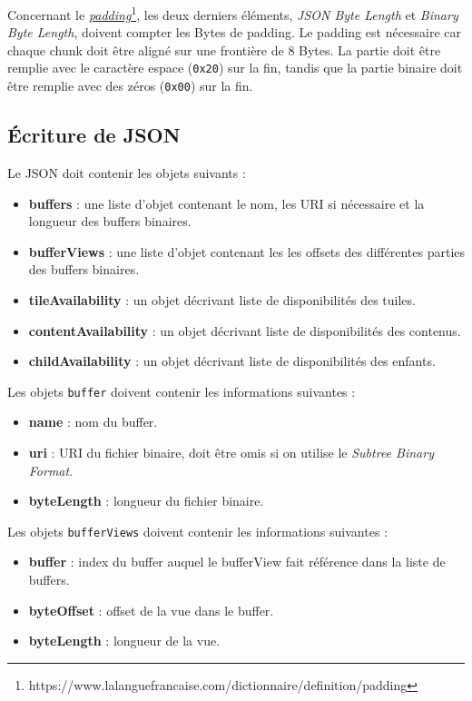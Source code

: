 Concernant le \href{https://www.lalanguefrancaise.com/dictionnaire/definition/padding}\textit{padding}\footnote{https://www.lalanguefrancaise.com/dictionnaire/definition/padding}, les deux derniers éléments, \textit{JSON Byte Length} et \textit{Binary Byte Length}, doivent compter les Bytes de padding. Le padding est nécessaire car chaque chunk doit être aligné sur une frontière de 8 Bytes. La partie doit être remplie avec le caractère espace (\texttt{0x20}) sur la fin, tandis que la partie binaire doit être remplie avec des zéros (\texttt{0x00}) sur la fin.

\newpage
\subsection{Écriture de JSON}

Le JSON doit contenir les objets suivants :

\begin{itemize}
    \item \textbf{buffers} : une liste d'objet contenant le nom, les URI si nécessaire et la longueur des buffers binaires.
    \item \textbf{bufferViews} : une liste d'objet contenant les les offsets des différentes parties des buffers binaires.
    \item \textbf{tileAvailability} : un objet décrivant liste de disponibilités des tuiles.
    \item \textbf{contentAvailability} : un objet décrivant liste de disponibilités des contenus.
    \item \textbf{childAvailability} : un objet décrivant liste de disponibilités des enfants.
\end{itemize}

Les objets \texttt{buffer} doivent contenir les informations suivantes :

\begin{itemize}
    \item \textbf{name} : nom du buffer.
    \item \textbf{uri} : URI du fichier binaire, doit être omis si on utilise le \textit{Subtree Binary Format}.
    \item \textbf{byteLength} : longueur du fichier binaire.
\end{itemize}

Les objets \texttt{bufferViews} doivent contenir les informations suivantes :

\begin{itemize}
    \item \textbf{buffer} : index du buffer auquel le bufferView fait référence dans la liste de buffers.
    \item \textbf{byteOffset} : offset de la vue dans le buffer.
    \item \textbf{byteLength} : longueur de la vue.
\end{itemize}

